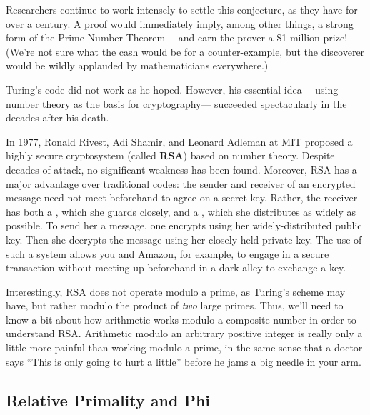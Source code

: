 {Researchers continue to work intensely to settle this conjecture, as they
have for over a century.  A proof would immediately imply, among other
things, a strong form of the Prime Number Theorem--- and earn the prover a
\$1 million prize!  (We're not sure what the cash would be for a
counter-example, but the discoverer would be wildly applauded by
mathematicians everywhere.)}




Turing's code did not work as he hoped.  However, his essential
idea--- using number theory as the basis for cryptography--- succeeded
spectacularly in the decades after his death.

In 1977, Ronald Rivest, Adi Shamir, and Leonard Adleman at MIT proposed a
highly secure cryptosystem (called \textbf{RSA}) based on number theory.
Despite decades of attack, no significant weakness has been found.
Moreover, RSA has a major advantage over traditional codes: the sender and
receiver of an encrypted message need not meet beforehand to agree on a
secret key.  Rather, the receiver has both a , which she
guards closely, and a , which she distributes as widely
as possible.  To send her a message, one encrypts using her
widely-distributed public key.  Then she decrypts the message using her
closely-held private key.  The use of such a  system allows you and Amazon, for example, to engage in a
secure transaction without meeting up beforehand in a dark alley to
exchange a key.

Interestingly, RSA does not operate modulo a prime, as Turing's scheme
may have, but rather modulo the product of \textit{two} large primes.
Thus, we'll need to know a bit about how arithmetic works modulo a
composite number in order to understand RSA.  Arithmetic modulo an
arbitrary positive integer is really only a little more painful than
working modulo a prime, in the same sense that a doctor says ``This is
only going to hurt a little'' before he jams a big needle in your arm.

\subsection{Relative Primality and Phi}

